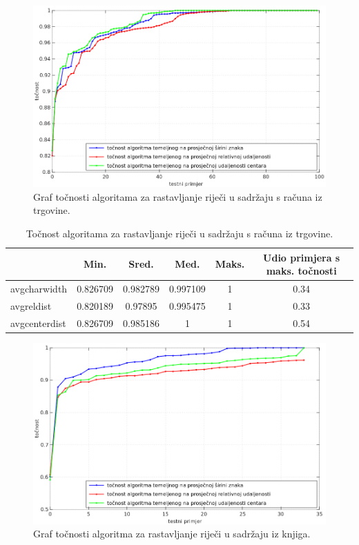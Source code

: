 \documentclass[times, utf8, zavrsni]{fer}
\begin{document}
\begin{figure}[htb]
    \centering
    \captionsetup{justification=centering,margin=2cm}
    \includegraphics[width=\textwidth]{images/result-03.png}
    \caption{
        Graf točnosti algoritama za rastavljanje riječi u sadržaju s računa iz trgovine.
    }
    \label{fig:result-03}
\end{figure}

\begin{table}[htb]
\caption{Točnost algoritama za rastavljanje riječi u sadržaju s računa iz trgovine.}
\label{tbl:result-02}
\centering
\begin{tabular}{lccccc} \hline
& Min. & Sred. & Med. & Maks. & Udio primjera s maks. točnosti \\ \hline
avgcharwidth & 0.826709 & 0.982789 & 0.997109 & 1 & 0.34 \\
avgreldist & 0.820189 & 0.97895 & 0.995475 & 1 & 0.33 \\
avgcenterdist & 0.826709 & 0.985186 & 1 & 1 & 0.54 \\ \hline
\end{tabular}
\end{table}

\begin{figure}[htb]
    \centering
    \captionsetup{justification=centering,margin=2cm}
    \includegraphics[width=\textwidth]{images/result-04.png}
    \caption{
        Graf točnosti algoritma za rastavljanje riječi u sadržaju iz knjiga.
    }
    \label{fig:result-04}
\end{figure}
\end{document}
